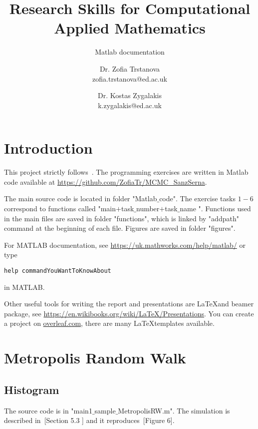 \documentclass{scrartcl}
\title{Research Skills for Computational Applied Mathematics}
\subtitle{Matlab documentation}
\begin{document}
\begin{titlepage}
\author{Dr. Zofia Trstanova\\zofia.trstanova@ed.ac.uk \and Dr. Kostas Zygalakis\\ k.zygalakis@ed.ac.uk}


\clearpage\maketitle
\thispagestyle{empty}
\end{titlepage}

\newpage
\setcounter{page}{1}

\section{Introduction}
This project strictly follows~\cite{sanz2014markov}. The programming exercises are written in Matlab code available at \url{https://github.com/ZofiaTr/MCMC_SanzSerna}.

The main source code is located in folder "Matlab$\_$code". The exercise tasks $1-6$ correspond to functions called "main$+$task$\_$number$+$task$\_$name ". Functions used in the main files are saved in folder "functions", which is linked by "addpath" command at the beginning of each file. Figures are saved in folder "figures".

For MATLAB documentation, see \url{https://uk.mathworks.com/help/matlab/} or type
\begin{verbatim}
help commandYouWantToKnowAbout
\end{verbatim}
in MATLAB. 

Other useful tools for writing the report and presentations are \LaTeX and beamer package, see \url{https://en.wikibooks.org/wiki/LaTeX/Presentations}. You can create a project on \url{overleaf.com},  there are many \LaTeX  templates available.

\section{Metropolis Random Walk}

\subsection{Histogram}
The source code is in "main1$\_$sample$\_$MetropolisRW.m". The simulation is described in~\cite{sanz2014markov}[Section 5.3 ] and it reproduces~\cite{sanz2014markov}[Figure 6].
\end{document}
